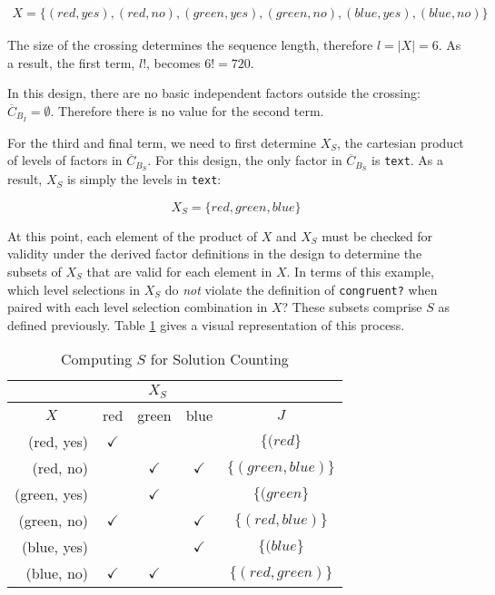 \begin{align*}
X = \{(red, yes), (red, no), (green, yes), (green, no), (blue, yes), (blue, no)\}
\end{align*}

The size of the crossing determines the sequence length, therefore $l = |X| = 6$. As a result, the first term, $l!$, becomes $6! = 720$.

In this design, there are no basic independent factors outside the crossing: $\overline{C}_{B_I} = \emptyset$. Therefore there is no value for the second term.

For the third and final term, we need to first determine $X_S$, the cartesian product of levels of factors in $\overline{C}_{B_S}$. For this design, the only factor in $\overline{C}_{B_S}$ is \texttt{text}. As a result, $X_S$ is simply the levels in \texttt{text}:

\[
X_S = \{red, green, blue\}
\]

At this point, each element of the product of $X$ and $X_S$ must be checked for validity under the derived factor definitions in the design to determine the subsets of $X_S$ that are valid for each element in $X$. In terms of this example, which level selections in $X_S$ do \textit{not} violate the definition of \texttt{congruent?} when paired with each level selection combination in $X$? These subsets comprise $S$ as defined previously. Table \ref{tab:example_s} gives a visual representation of this process.

\begin{table}[htb]
  \centering
  \caption{Computing $S$ for Solution Counting}
\begin{tabular}{r|c|c|c|c}
\cline{2-4}
\multicolumn{1}{c|}{}              & \multicolumn{3}{c|}{$X_S$}                 & \multicolumn{1}{l}{}                     \\ \hline
\multicolumn{1}{|c|}{$X$}          & red          & green        & blue         & \multicolumn{1}{c|}{$J$}                 \\ \hline
\multicolumn{1}{|r|}{(red, yes)}   & $\checkmark$ &              &              & \multicolumn{1}{c|}{$\{(red\}$}         \\ \hline
\multicolumn{1}{|r|}{(red, no)}    &              & $\checkmark$ & $\checkmark$ & \multicolumn{1}{c|}{$\{(green, blue)\}$} \\ \hline
\multicolumn{1}{|r|}{(green, yes)} &              & $\checkmark$ &              & \multicolumn{1}{c|}{$\{(green\}$}       \\ \hline
\multicolumn{1}{|r|}{(green, no)}  & $\checkmark$ &              & $\checkmark$ & \multicolumn{1}{c|}{$\{(red, blue)\}$}   \\ \hline
\multicolumn{1}{|r|}{(blue, yes)}  &              &              & $\checkmark$ & \multicolumn{1}{c|}{$\{(blue\}$}        \\ \hline
\multicolumn{1}{|r|}{(blue, no)}   & $\checkmark$ & $\checkmark$ &              & \multicolumn{1}{c|}{$\{(red, green)\}$}  \\ \hline
\end{tabular}
\label{tab:example_s}%
\end{table}

